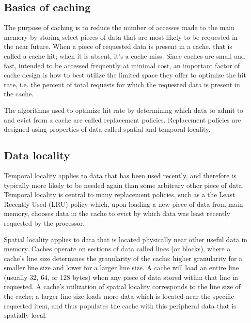 \documentclass[12pt,twoside]{reedthesis}
\begin{document}
	\subsection*{Basics of caching}
	
	The purpose of caching is to reduce the number of accesses made to the main memory by storing select pieces of data that are most likely to be requested in the near future. When a piece of requested data is present in a cache, that is called a cache hit; when it is absent, it's a cache miss. Since caches are small and fast, intended to be accessed frequently at minimal cost, an important factor of cache design is how to best utilize the limited space they offer to optimize the hit rate, i.e. the percent of total requests for which the requested data is present in the cache.
	
	The algorithms used to optimize hit rate by determining which data to admit to and evict from a cache are called replacement policies. Replacement policies are designed using properties of data called spatial and temporal locality.

	\subsection*{Data locality}
	
	Temporal locality applies to data that has been used recently, and therefore is typically more likely to be needed again than some arbitrary other piece of data. Temporal locality is central to many replacement policies, such as a the Least Recently Used (LRU) policy which, upon loading a new piece of data from main memory, chooses data in the cache to evict by which data was least recently requested by the processor.
	
	Spatial locality applies to data that is located physically near other useful data in memory. Caches operate on sections of data called lines (or blocks), where a cache's line size determines the granularity of the cache: higher granularity for a smaller line size and lower for a larger line size. A cache will load an entire line (usually 32, 64, or 128 bytes) when any piece of data stored within that line in requested. A cache's utilization of spatial locality corresponds to the line size of the cache; a larger line size loads more data which is located near the specific requested item, and thus populates the cache with this peripheral data that is spatially local.
\end{document}
